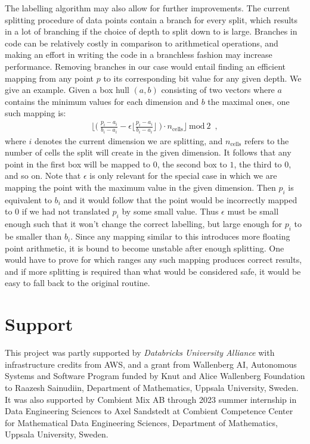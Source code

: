 \documentclass{report}
\begin{document}
The labelling algorithm may also allow for further improvements. 
The current splitting procedure of data points contain a branch for every split, which results in
a lot of branching if the choice of depth to split down to is large. Branches in code can be 
relatively costly in comparison to arithmetical operations, and making an effort in writing the
code in a branchless fashion may increase performance. Removing branches in our case would entail
finding an efficient mapping from any point $p$ to its corresponding bit value for any given depth.
We give an example. Given a box hull $(a,b)$ consisting of two vectors where $a$ 
contains the minimum values for each dimension and $b$ the maximal ones, one such mapping is: 
\begin{align*}
	\bigg\lfloor \bigg(\ \frac{p_i - a_i}{b_i - a_i} - \epsilon \bigg\lfloor\frac{p_i - a_i}{b_i - a_i}\bigg\rfloor\ \bigg) \cdot n_\text{cells} \bigg\rfloor \ \text{mod}\  2 \enspace,
\end{align*}
where $i$ denotes the current dimension we are splitting, and $n_\text{cells}$ refers to the number of cells 
the split will create in the given dimension. It  follows that any point in the first box will be mapped to $0$, the second box to
$1$, the third to $0$, and so on. Note that $\epsilon$ is only relevant for the special case in which we are mapping the point with the maximum value in the given dimension. Then $p_i$ is equivalent to $b_i$ and it would follow that
the point would be incorrectly mapped to $0$ if we had not translated $p_i$ by some small value. Thus $\epsilon$ must be small enough such that it won't change the correct labelling, 
but large enough for $p_i$ to be smaller than $b_i$. Since any mapping similar to this introduces
more floating point arithmetic, it is bound to become unstable after enough splitting. One would have to prove for which ranges any such mapping produces correct results,
and if more splitting is required than what would be considered safe, it would be easy to fall back to the original routine. 

\chapter*{Support}
This project was partly supported by \textit{Databricks University Alliance} with infrastructure credits from AWS, and a grant from Wallenberg AI, Autonomous Systems and Software Program funded by Knut and Alice Wallenberg Foundation to Raazesh Sainudiin, Department of Mathematics, Uppsala University, Sweden.
It was also supported by Combient Mix AB through 2023 summer internship in Data Engineering Sciences to Axel Sandstedt at Combient Competence Center for Mathematical Data Engineering Sciences, Department of Mathematics, Uppsala University, Sweden. 
\end{document}
